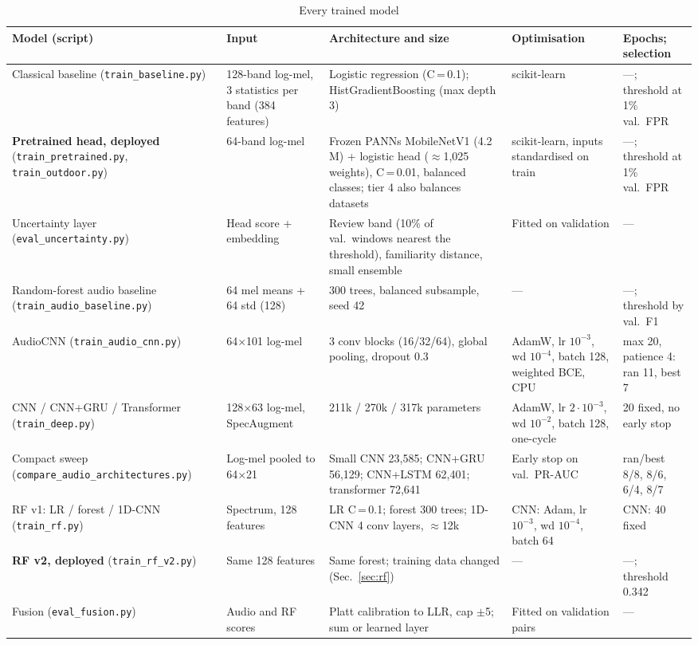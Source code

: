 \documentclass[conference,a4paper]{IEEEtran}
\begin{document}
\begin{table}[!t]
\centering\footnotesize
\caption{Every trained model}
\label{tab:train}
\begin{tabularx}{\textwidth}{@{}L{3.3cm} L{2.9cm} Y L{3.2cm} L{2.6cm}@{}}
\toprule
Model (script) & Input & Architecture and size & Optimisation & Epochs; selection \\
\midrule
Classical baseline (\texttt{train\_baseline.py}) & 128-band log-mel, 3 statistics per band (384 features) & Logistic regression (C\,=\,0.1); HistGradientBoosting (max depth 3) & scikit-learn & ---; threshold at 1\% val.\ FPR \\
\textbf{Pretrained head, deployed} (\texttt{train\_pretrained.py}, \texttt{train\_outdoor.py}) & 64-band log-mel & Frozen PANNs MobileNetV1 (4.2\,M) + logistic head ($\approx$1,025 weights), C\,=\,0.01, balanced classes; tier 4 also balances datasets & scikit-learn, inputs standardised on train & ---; threshold at 1\% val.\ FPR \\
Uncertainty layer (\texttt{eval\_uncertainty.py}) & Head score + embedding & Review band (10\% of val.\ windows nearest the threshold), familiarity distance, small ensemble & Fitted on validation & --- \\
Random-forest audio baseline (\texttt{train\_audio\_baseline.py}) & 64 mel means + 64 std (128) & 300 trees, balanced subsample, seed 42 & --- & ---; threshold by val.\ F1 \\
AudioCNN (\texttt{train\_audio\_cnn.py}) & 64$\times$101 log-mel & 3 conv blocks (16/32/64), global pooling, dropout 0.3 & AdamW, lr $10^{-3}$, wd $10^{-4}$, batch 128, weighted BCE, CPU & max 20, patience 4: ran 11, best 7 \\
CNN / CNN+GRU / Transformer (\texttt{train\_deep.py}) & 128$\times$63 log-mel, SpecAugment & 211k / 270k / 317k parameters & AdamW, lr $2\cdot10^{-3}$, wd $10^{-2}$, batch 128, one-cycle & 20 fixed, no early stop \\
Compact sweep (\texttt{compare\_audio\_architectures.py}) & Log-mel pooled to 64$\times$21 & Small CNN 23,585; CNN+GRU 56,129; CNN+LSTM 62,401; transformer 72,641 & Early stop on val.\ PR-AUC & ran/best 8/8, 8/6, 6/4, 8/7 \\
\midrule
RF v1: LR / forest / 1D-CNN (\texttt{train\_rf.py}) & Spectrum, 128 features & LR C\,=\,0.1; forest 300 trees; 1D-CNN 4 conv layers, $\approx$12k & CNN: Adam, lr $10^{-3}$, wd $10^{-4}$, batch 64 & CNN: 40 fixed \\
\textbf{RF v2, deployed} (\texttt{train\_rf\_v2.py}) & Same 128 features & Same forest; training data changed (Sec.~\ref{sec:rf}) & --- & ---; threshold 0.342 \\
Fusion (\texttt{eval\_fusion.py}) & Audio and RF scores & Platt calibration to LLR, cap $\pm$5; sum or learned layer & Fitted on validation pairs & --- \\
\bottomrule
\end{tabularx}
\end{table}
\end{document}
